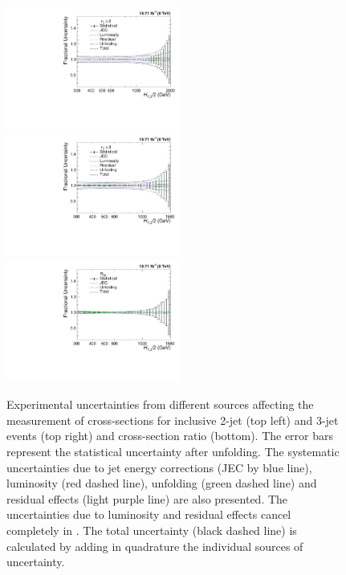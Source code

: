 \begin{figure}[!h]
 \begin{center}
 \hspace*{-3mm}\includegraphics[width=0.51\textwidth]{Plots_HT_2_150/Total_unc_all_2_NLO_add.pdf}%
 ~~\includegraphics[width=0.51\textwidth]{Plots_HT_2_150/Total_unc_all_3_NLO_add.pdf}\\
 \includegraphics[width=0.51\textwidth]{Plots_HT_2_150/Total_Unc_ratio_32_direct_add.pdf}
 \caption{Experimental uncertainties from different sources affecting the measurement of cross-sections for inclusive 2-jet (top left) and 3-jet events (top right) and cross-section ratio \ratio (bottom). The error bars represent the statistical uncertainty after unfolding. The systematic uncertainties due to jet energy corrections (JEC by blue line), luminosity (red dashed line), unfolding (green dashed line) and residual effects (light purple line) are also presented. The uncertainties due to luminosity and residual effects cancel completely in \ratio. The total uncertainty (black dashed line) is calculated by adding in quadrature the individual sources of uncertainty.}
 \label{fig:exp_unc}
 \end{center}
\end{figure}

